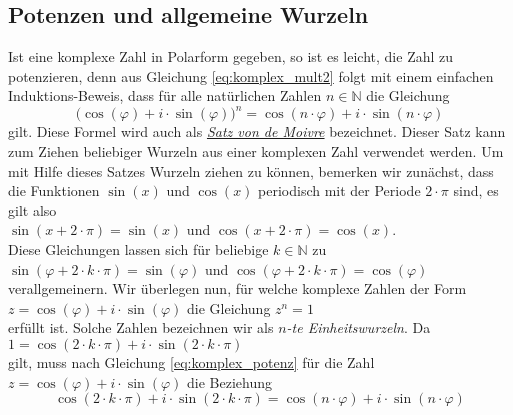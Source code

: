 \subsection{Potenzen und allgemeine Wurzeln}
Ist eine komplexe Zahl in Polarform gegeben, so ist es leicht, die Zahl zu
potenzieren, denn aus Gleichung \ref{eq:komplex_mult2} folgt mit einem einfachen Induktions-Beweis,
dass f\"{u}r alle nat\"{u}rlichen Zahlen $n \in \mathbb{N}$ die Gleichung
\begin{equation}
  \label{eq:komplex_potenz}
  \bigl(\cos(\varphi) + i \cdot \sin(\varphi)\bigr)^n = \cos(n \cdot \varphi) + i \cdot \sin(n \cdot \varphi)
\end{equation}
gilt.  Diese Formel wird auch als \href{http://de.wikipedia.org/wiki/Abraham_de_Moivre}{\emph{Satz von de Moivre}} bezeichnet.  
Dieser Satz kann zum Ziehen beliebiger Wurzeln aus einer komplexen Zahl verwendet werden.  Um mit Hilfe dieses Satzes Wurzeln ziehen
zu k\"{o}nnen, bemerken wir zun\"{a}chst, dass die Funktionen $\sin(x)$ und $\cos(x)$ periodisch mit der Periode
$2 \cdot \pi$ sind, es gilt also
\\[0.2cm]
\hspace*{1.3cm}
$\sin(x + 2 \cdot \pi) = \sin(x)$ \quad und \quad
$\cos(x + 2 \cdot \pi) = \cos(x)$.
\\[0.2cm]
Diese Gleichungen lassen sich f\"{u}r beliebige $k \in \mathbb{N}$ zu
\\[0.2cm]
\hspace*{1.3cm}
$\sin(\varphi + 2 \cdot k \cdot \pi) = \sin(\varphi)$ \quad und \quad
$\cos(\varphi + 2 \cdot k \cdot \pi) = \cos(\varphi)$
\\[0.2cm]
verallgemeinern.  Wir \"{u}berlegen nun, f\"{u}r welche komplexe Zahlen der Form
\\[0.2cm]
\hspace*{1.3cm}
$z = \cos(\varphi) + i \cdot \sin(\varphi)$ \quad die Gleichung \quad $z^n = 1$
\\[0.2cm]
erf\"{u}llt ist.  Solche Zahlen bezeichnen wir als \emph{\color{blue}$n$-te Einheitswurzeln}.  Da 
\\[0.2cm]
\hspace*{1.3cm}
$1 = \cos(2 \cdot k \cdot \pi) + i \cdot \sin(2 \cdot k \cdot \pi)$
\\[0.2cm]
gilt, muss nach Gleichung \ref{eq:komplex_potenz} f\"{u}r die Zahl $z = \cos(\varphi) + i \cdot \sin(\varphi)$
die Beziehung
\begin{equation}
  \label{eq:komplex_wurzel0}
\cos(2 \cdot k \cdot \pi) + i \cdot \sin(2 \cdot k \cdot \pi) =
\cos(n \cdot \varphi) + i \cdot \sin(n \cdot \varphi)  
\end{equation}
